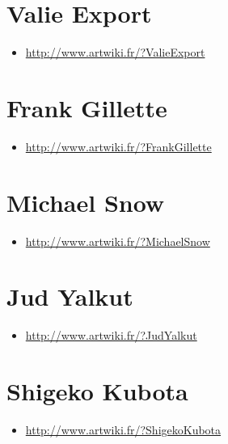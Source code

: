 \documentclass[
  french,
]{book}
\providecommand{\tightlist}{%
  \setlength{\itemsep}{0pt}\setlength{\parskip}{0pt}}
\begin{document}
\hypertarget{valie-export}{%
\section{Valie Export}\label{valie-export}}

\begin{itemize}
\tightlist
\item
  \url{http://www.artwiki.fr/?ValieExport}
\end{itemize}

\hypertarget{frank-gillette}{%
\section{Frank Gillette}\label{frank-gillette}}

\begin{itemize}
\tightlist
\item
  \url{http://www.artwiki.fr/?FrankGillette}
\end{itemize}

\hypertarget{michael-snow}{%
\section{Michael Snow}\label{michael-snow}}

\begin{itemize}
\tightlist
\item
  \url{http://www.artwiki.fr/?MichaelSnow}
\end{itemize}

\hypertarget{jud-yalkut}{%
\section{Jud Yalkut}\label{jud-yalkut}}

\begin{itemize}
\tightlist
\item
  \url{http://www.artwiki.fr/?JudYalkut}
\end{itemize}

\hypertarget{shigeko-kubota}{%
\section{Shigeko Kubota}\label{shigeko-kubota}}

\begin{itemize}
\tightlist
\item
  \url{http://www.artwiki.fr/?ShigekoKubota}
\end{itemize}
\end{document}
